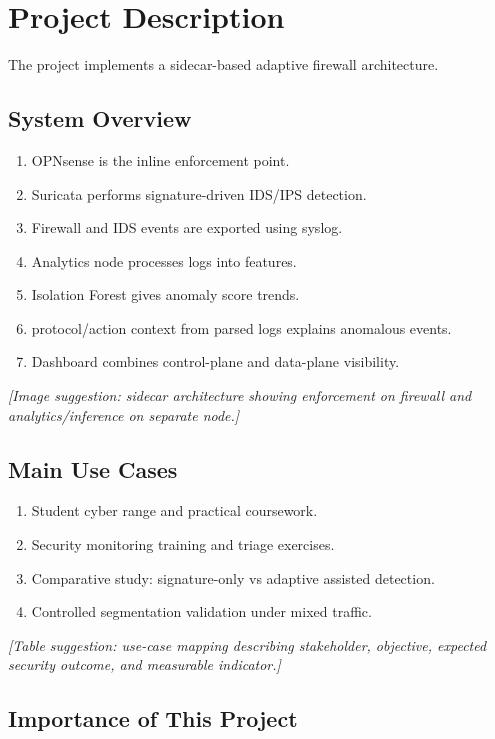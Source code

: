 \documentclass[12pt,a4paper]{article}
\begin{document}
\section{Project Description}

The project implements a sidecar-based adaptive firewall architecture.

\subsection{System Overview}

\begin{enumerate}
    \item OPNsense is the inline enforcement point.
    \item Suricata performs signature-driven IDS/IPS detection.
    \item Firewall and IDS events are exported using syslog.
    \item Analytics node processes logs into features.
    \item Isolation Forest gives anomaly score trends.
    \item protocol/action context from parsed logs explains anomalous events.
    \item Dashboard combines control-plane and data-plane visibility.
\end{enumerate}

\textit{[Image suggestion: sidecar architecture showing enforcement on firewall and analytics/inference on separate node.]}

\subsection{Main Use Cases}

\begin{enumerate}
    \item Student cyber range and practical coursework.
    \item Security monitoring training and triage exercises.
    \item Comparative study: signature-only vs adaptive assisted detection.
    \item Controlled segmentation validation under mixed traffic.
\end{enumerate}

\textit{[Table suggestion: use-case mapping describing stakeholder, objective, expected security outcome, and measurable indicator.]}

\subsection{Importance of This Project}
\end{document}
